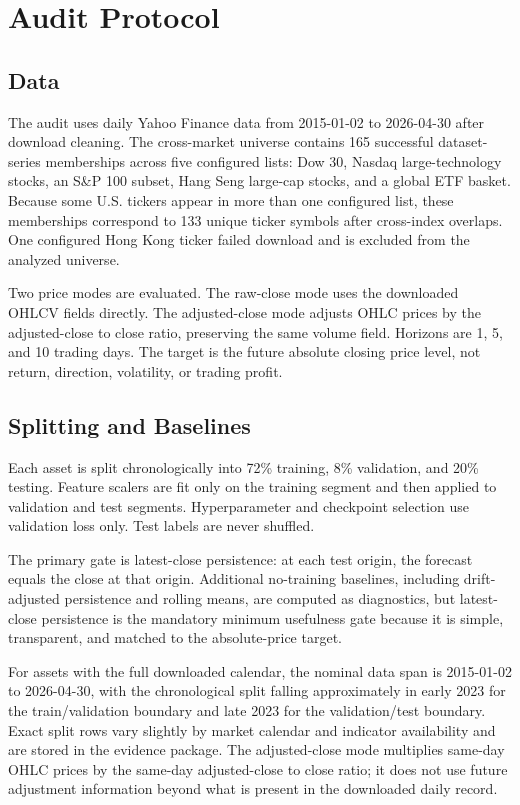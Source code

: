 \documentclass[11pt]{article}
\begin{document}
\section{Audit Protocol}

\subsection{Data}

The audit uses daily Yahoo Finance data from 2015-01-02 to 2026-04-30 after download cleaning. The cross-market universe contains 165 successful dataset-series memberships across five configured lists: Dow 30, Nasdaq large-technology stocks, an S\&P 100 subset, Hang Seng large-cap stocks, and a global ETF basket. Because some U.S. tickers appear in more than one configured list, these memberships correspond to 133 unique ticker symbols after cross-index overlaps. One configured Hong Kong ticker failed download and is excluded from the analyzed universe.

Two price modes are evaluated. The raw-close mode uses the downloaded OHLCV fields directly. The adjusted-close mode adjusts OHLC prices by the adjusted-close to close ratio, preserving the same volume field. Horizons are 1, 5, and 10 trading days. The target is the future absolute closing price level, not return, direction, volatility, or trading profit.



\subsection{Splitting and Baselines}

Each asset is split chronologically into 72\% training, 8\% validation, and 20\% testing. Feature scalers are fit only on the training segment and then applied to validation and test segments. Hyperparameter and checkpoint selection use validation loss only. Test labels are never shuffled.

The primary gate is latest-close persistence: at each test origin, the forecast equals the close at that origin. Additional no-training baselines, including drift-adjusted persistence and rolling means, are computed as diagnostics, but latest-close persistence is the mandatory minimum usefulness gate because it is simple, transparent, and matched to the absolute-price target.

For assets with the full downloaded calendar, the nominal data span is 2015-01-02 to 2026-04-30, with the chronological split falling approximately in early 2023 for the train/validation boundary and late 2023 for the validation/test boundary. Exact split rows vary slightly by market calendar and indicator availability and are stored in the evidence package. The adjusted-close mode multiplies same-day OHLC prices by the same-day adjusted-close to close ratio; it does not use future adjustment information beyond what is present in the downloaded daily record.
\end{document}
